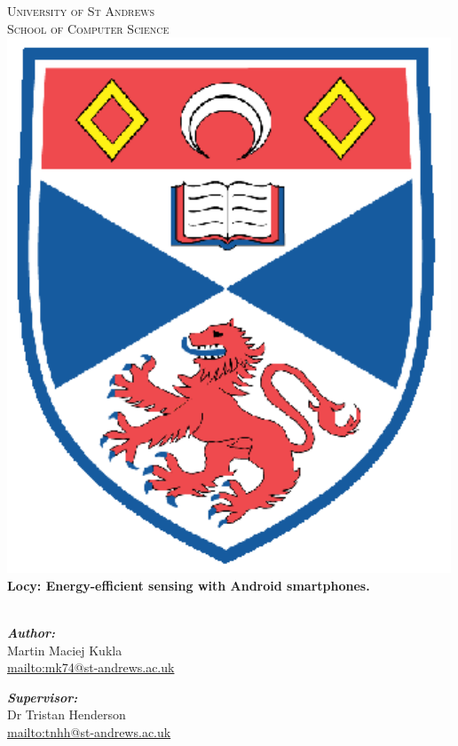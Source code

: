 \begin{titlepage}

\begin{center}

\vfill

\textsc{\Large University of St Andrews \\ School of Computer Science}\\[1.5cm]


\includegraphics[scale=0.5]{crest}
\vfill
\HRule \\[0.4cm]
{\bfseries \huge Locy: Energy-efficient sensing with Android smartphones.}\\[0.4cm]

\HRule \\[1.5cm]



\begin{minipage}{0.4\textwidth}
\begin{flushleft} \large
\emph{\textbf{Author:}} \\
Martin Maciej Kukla\\
\small \url{mailto:mk74@st-andrews.ac.uk}\\
\end{flushleft}
\end{minipage}
\begin{minipage}{0.4\textwidth}
\begin{flushright} \large
\emph{\textbf{Supervisor:}} \\
Dr Tristan Henderson\\
\small \url{mailto:tnhh@st-andrews.ac.uk}\\


\end{flushright}
\end{minipage}
\end{center}
\end{titlepage}
